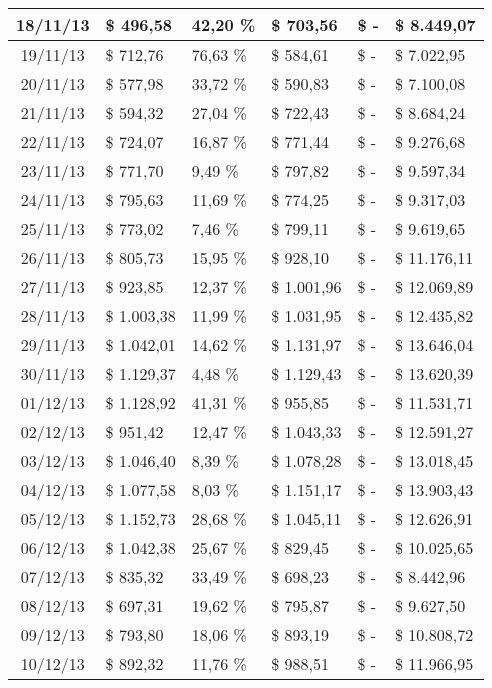 \begin{small}
\begin{longtable}{|c|l|l|l|l|l|}
18/11/13 & \$ 496,58 & 42,20 \% & \$ 703,56 & \$ - & \$ 8.449,07 \\ \hline
19/11/13 & \$ 712,76 & 76,63 \% & \$ 584,61 & \$ - & \$ 7.022,95 \\ \hline
20/11/13 & \$ 577,98 & 33,72 \% & \$ 590,83 & \$ - & \$ 7.100,08 \\ \hline
21/11/13 & \$ 594,32 & 27,04 \% & \$ 722,43 & \$ - & \$ 8.684,24 \\ \hline
22/11/13 & \$ 724,07 & 16,87 \% & \$ 771,44 & \$ - & \$ 9.276,68 \\ \hline
23/11/13 & \$ 771,70 & 9,49 \% & \$ 797,82 & \$ - & \$ 9.597,34 \\ \hline
24/11/13 & \$ 795,63 & 11,69 \% & \$ 774,25 & \$ - & \$ 9.317,03 \\ \hline
25/11/13 & \$ 773,02 & 7,46 \% & \$ 799,11 & \$ - & \$ 9.619,65 \\ \hline
26/11/13 & \$ 805,73 & 15,95 \% & \$ 928,10 & \$ - & \$ 11.176,11 \\ \hline
27/11/13 & \$ 923,85 & 12,37 \% & \$ 1.001,96 & \$ - & \$ 12.069,89 \\ \hline
28/11/13 & \$ 1.003,38 & 11,99 \% & \$ 1.031,95 & \$ - & \$ 12.435,82 \\ \hline
29/11/13 & \$ 1.042,01 & 14,62 \% & \$ 1.131,97 & \$ - & \$ 13.646,04 \\ \hline
30/11/13 & \$ 1.129,37 & 4,48 \% & \$ 1.129,43 & \$ - & \$ 13.620,39 \\ \hline
01/12/13 & \$ 1.128,92 & 41,31 \% & \$ 955,85 & \$ - & \$ 11.531,71 \\ \hline
02/12/13 & \$ 951,42 & 12,47 \% & \$ 1.043,33 & \$ - & \$ 12.591,27 \\ \hline
03/12/13 & \$ 1.046,40 & 8,39 \% & \$ 1.078,28 & \$ - & \$ 13.018,45 \\ \hline
04/12/13 & \$ 1.077,58 & 8,03 \% & \$ 1.151,17 & \$ - & \$ 13.903,43 \\ \hline
05/12/13 & \$ 1.152,73 & 28,68 \% & \$ 1.045,11 & \$ - & \$ 12.626,91 \\ \hline
06/12/13 & \$ 1.042,38 & 25,67 \% & \$ 829,45 & \$ - & \$ 10.025,65 \\ \hline
07/12/13 & \$ 835,32 & 33,49 \% & \$ 698,23 & \$ - & \$ 8.442,96 \\ \hline
08/12/13 & \$ 697,31 & 19,62 \% & \$ 795,87 & \$ - & \$ 9.627,50 \\ \hline
09/12/13 & \$ 793,80 & 18,06 \% & \$ 893,19 & \$ - & \$ 10.808,72 \\ \hline
10/12/13 & \$ 892,32 & 11,76 \% & \$ 988,51 & \$ - & \$ 11.966,95 \\ \hline

\end{longtable}
\end{small}
